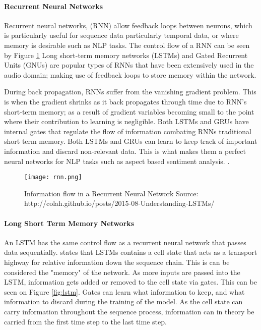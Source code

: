 \documentclass[11pt]{article}
\begin{document}
\paragraph{Recurrent Neural Networks}
Recurrent neural networks, (RNN) allow feedback loops between neurons, which is particularly useful for sequence data particularly temporal data, or where memory is desirable such as NLP tasks. The control flow of a RNN can be seen by Figure \ref{fig:rnn} \newline\newline
\newline\newline
Long short-term memory networks (LSTMs) and Gated Recurrent Units (GNUs) are popular types of RNNs that have been extensively used in the audio domain; making use of feedback loops to store memory within the network.

During back propagation, RNNs suffer from the vanishing gradient problem. This is when the gradient shrinks as it back propagates through time due to RNN's short-term memory; as a result of gradient variables becoming small to the point where their contribution to learning is negligible. 
\newline
Both LSTMs and GRUs have internal gates that regulate the flow of information combating RNNs traditional short term memory. Both LSTMs and GRUs can learn to keep track of important information and discard non-relevant data. This is what makes them a perfect neural networks for NLP tasks such as aspect based sentiment analysis. \textcolor{cite}{\citet{lstm}}.

\begin{figure}[h!]
\centering
\texttt{[image: rnn.png]}
\caption{Information flow in a Recurrent Neural Network \newline Source: http://colah.github.io/posts/2015-08-Understanding-LSTMs/}
\label{fig:rnn}
\end{figure}

\paragraph{Long Short Term Memory Networks} \label{lstm}

An LSTM has the same control flow as a recurrent neural network that passes data sequentially.
\textcolor{cite}{\citet{newcnns}} states that LSTMs contains a cell state that acts as a transport highway for relative information down the sequence chain. This is can be considered the "memory" of the network. As more inputs are passed into the LSTM, information gets added or removed to the cell state via gates. This can be seen on Figure \ref{fig:lstm}. Gates can learn what information to keep, and what information to discard during the training of the model. \newline\newline
As the cell state can carry information throughout the sequence process, information can in theory be carried from the first time step to the last time step. 
\end{document}
